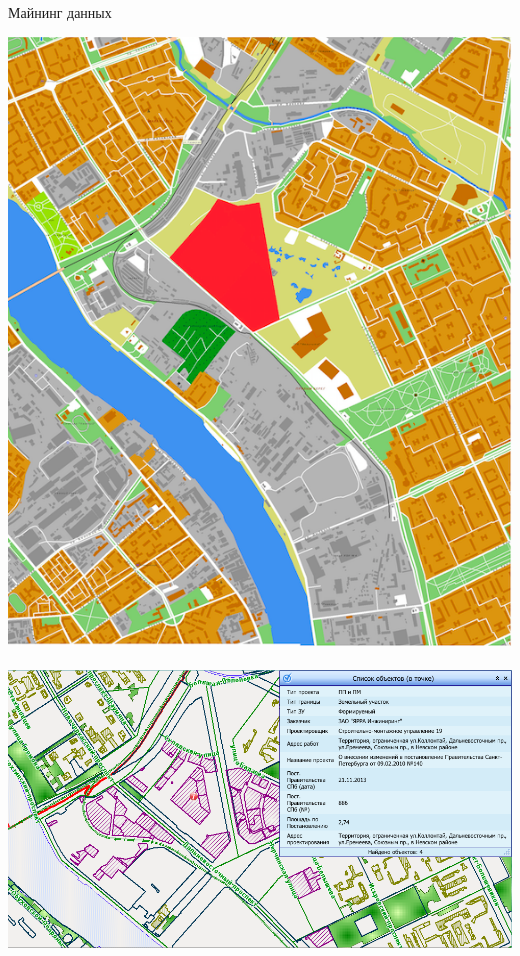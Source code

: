 \documentclass[14pt, fleqn, xcolor={dvipsnames, table}]{beamer}
\begin{document}
        \begin{frame}{Майнинг данных}
            \begin{center}
                \includegraphics[scale=0.20]{top-plan.png}~
                \includegraphics[scale=0.22]{rgis-info.png}
            \end{center} 
        \end{frame}
        
\end{document}
